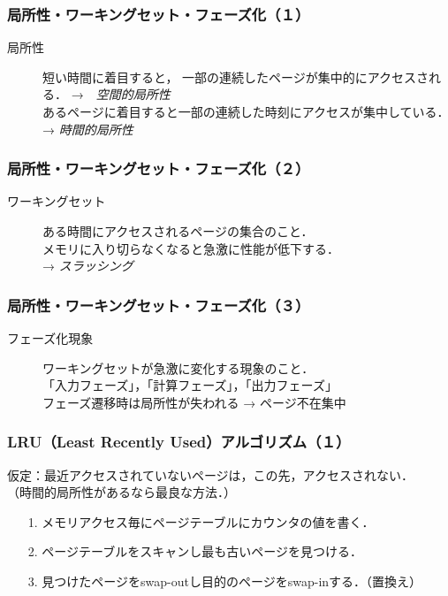 \documentclass[unicode]{beamer}                   %
\begin{document}
\begin{frame}
  \frametitle{局所性・ワーキングセット・フェーズ化（１）}
  \begin{description}
  \item[局所性]
    短い時間に着目すると，
    一部の連続したページが集中的にアクセスされる．
    →　\emph{空間的局所性}\\
    あるページに着目すると一部の連続した時刻にアクセスが集中している．
    → \emph{時間的局所性}
  \end{description}
\end{frame}

\begin{frame}
  \frametitle{局所性・ワーキングセット・フェーズ化（２）}
  \begin{description}
  \item[ワーキングセット]
    ある時間にアクセスされるページの集合のこと．\\
    メモリに入り切らなくなると急激に性能が低下する．\\
    → \emph{スラッシング}
  \end{description}
\end{frame}

\begin{frame}
  \frametitle{局所性・ワーキングセット・フェーズ化（３）}
  \begin{description}
  \item[フェーズ化現象]
    ワーキングセットが急激に変化する現象のこと．\\
    「入力フェーズ」，「計算フェーズ」，「出力フェーズ」 \\
    フェーズ遷移時は局所性が失われる → ページ不在集中
\end{description}
\end{frame}

\begin{frame}
  \frametitle{LRU（Least Recently Used）アルゴリズム（１）}
  仮定：最近アクセスされていないページは，この先，アクセスされない．\\
  （時間的局所性があるなら最良な方法．）
  \vspace{3mm}
  \begin{enumerate}
  \item[1.] メモリアクセス毎にページテーブルにカウンタの値を書く．
  \item[2.] ページテーブルをスキャンし最も古いページを見つける．
  \item[3.] 見つけたページをswap-outし目的のページをswap-inする．（置換え）
  \end{enumerate}
\end{frame}
\end{document}
